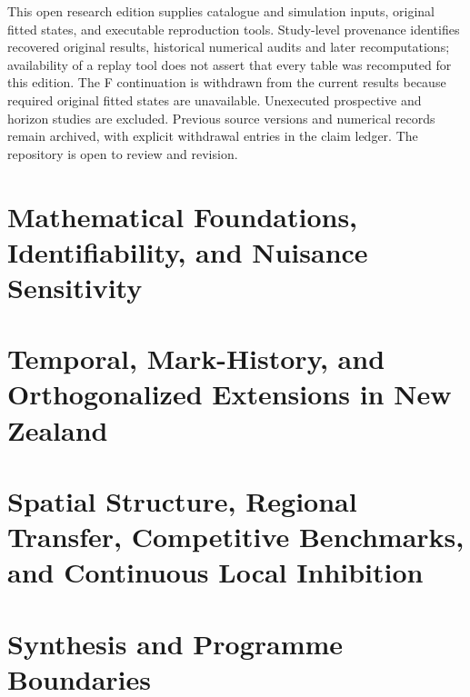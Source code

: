 \documentclass[11pt,a4paper,oneside,openany]{report}
\begin{document}
\noindent This open research edition supplies catalogue and simulation inputs, original fitted states, and executable reproduction tools. Study-level provenance identifies recovered original results, historical numerical audits and later recomputations; availability of a replay tool does not assert that every table was recomputed for this edition. The F continuation is withdrawn from the current results because required original fitted states are unavailable. Unexecuted prospective and horizon studies are excluded. Previous source versions and numerical records remain archived, with explicit withdrawal entries in the claim ledger. The repository is open to review and revision.
\clearpage

\clearpage
{}
\hypersetup{pageanchor=true}
\tableofcontents
\clearpage
{}
\part{Mathematical Foundations, Identifiability, and Nuisance Sensitivity}







\part{Temporal, Mark-History, and Orthogonalized Extensions in New Zealand}


\part{Spatial Structure, Regional Transfer, Competitive Benchmarks, and Continuous Local Inhibition}




\part{Synthesis and Programme Boundaries}

\appendix

{\small\setlength{\bibsep}{4pt}}
\end{document}
